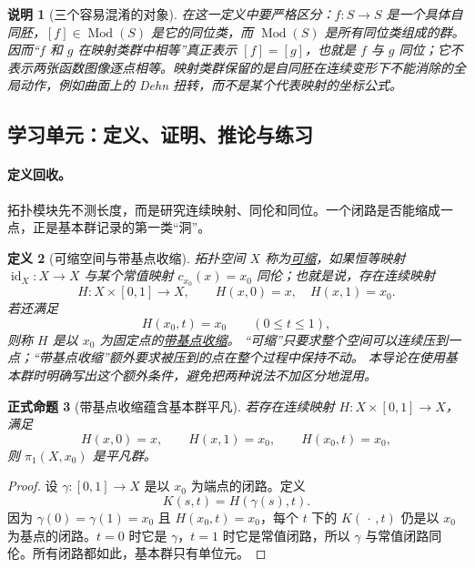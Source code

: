\documentclass[UTF8,fontset=none,a4paper,11pt]{ctexart}
\theoremstyle{foundation-definition}
\newtheorem{definition}{定义}[section]
\theoremstyle{foundation-theorem}
\theoremstyle{foundation-proposition}
\newtheorem{proposition}[definition]{正式命题}
\theoremstyle{foundation-example}
\theoremstyle{foundation-remark}
\newtheorem{remark}[definition]{说明}
\theoremstyle{foundation-theorem}
\newcommand{\Mod}{\operatorname{Mod}}
\newcommand{\term}[2]{\hyperref[#1]{#2}}
\begin{document}
\begin{remark}[三个容易混淆的对象]
在这一定义中要严格区分：\(f:S\to S\) 是一个具体自同胚，\([f]\in\Mod(S)\) 是它的同位类，而
\(\Mod(S)\) 是所有同位类组成的群。因而“\(f\) 和 \(g\) 在映射类群中相等”真正表示
\([f]=[g]\)，也就是 \(f\) 与 \(g\) 同位；它不表示两张函数图像逐点相等。映射类群保留的是自同胚在连续变形下不能消除的全局动作，例如曲面上的 Dehn 扭转，而不是某个代表映射的坐标公式。
\end{remark}

\subsection{学习单元：定义、证明、推论与练习}

\paragraph{定义回收。}
拓扑模块先不测长度，而是研究连续映射、同伦和同位。一个闭路是否能缩成一点，正是基本群记录的第一类“洞”。

\begin{definition}[可缩空间与带基点收缩]\label{def:contractible}
拓扑空间 \(X\) 称为\term{def:contractible}{可缩}，如果恒等映射
\(\operatorname{id}_X:X\to X\) 与某个常值映射
\(c_{x_0}(x)=x_0\) 同伦；也就是说，存在连续映射
\[
H:X\times[0,1]\longrightarrow X,
\qquad H(x,0)=x,\quad H(x,1)=x_0.
\]
若还满足
\[
H(x_0,t)=x_0\qquad(0\leq t\leq1),
\]
则称 \(H\) 是以 \(x_0\) 为固定点的\term{def:contractible}{带基点收缩}。
“可缩”只要求整个空间可以连续压到一点；“带基点收缩”额外要求被压到的点在整个过程中保持不动。
本导论在使用基本群时明确写出这个额外条件，避免把两种说法不加区分地混用。
\end{definition}

\begin{proposition}[带基点收缩蕴含基本群平凡]\label{prop:contractible-pi1}
若存在连续映射 \(H:X\times[0,1]\to X\)，满足
\[
H(x,0)=x,\qquad H(x,1)=x_0,\qquad H(x_0,t)=x_0,
\]
则 \(\pi_1(X,x_0)\) 是平凡群。
\end{proposition}

\begin{proof}
设 \(\gamma:[0,1]\to X\) 是以 \(x_0\) 为端点的闭路。定义
\[
K(s,t)=H(\gamma(s),t).
\]
因为 \(\gamma(0)=\gamma(1)=x_0\) 且 \(H(x_0,t)=x_0\)，每个 \(t\) 下的 \(K(\,\cdot\,,t)\) 仍是以 \(x_0\) 为基点的闭路。\(t=0\) 时它是 \(\gamma\)，\(t=1\) 时它是常值闭路，所以 \(\gamma\) 与常值闭路同伦。所有闭路都如此，基本群只有单位元。
\end{proof}
\end{document}
